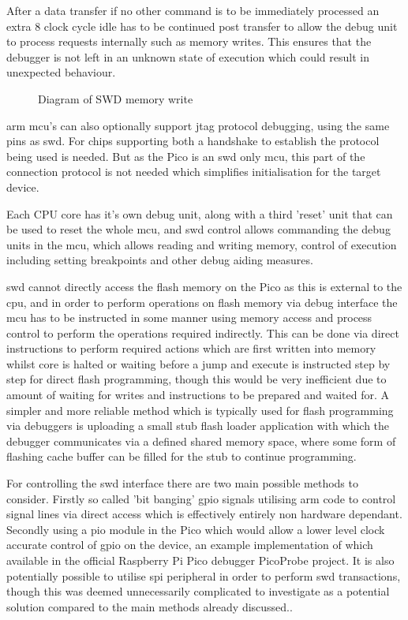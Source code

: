 {After a data transfer if no other command is to be immediately processed an extra 8 clock cycle idle has to be continued post transfer to allow the debug unit to process requests internally such as memory writes. This ensures that the debugger is not left in an unknown state of execution which could result in unexpected behaviour.

\begin{figure}[ht]
	\centering
	\caption{Diagram of SWD memory write\cite{ARMDebugInterface}}
	\label{fig:armswdwrite}
\end{figure}

\gls{arm} \gls{mcu}'s can also optionally support \gls{jtag} protocol debugging, using the same pins as \gls{swd}. For chips supporting both a handshake to establish the protocol being used is needed. But as the Pico is an \gls{swd} only \gls{mcu}, this part of the connection protocol is not needed which simplifies initialisation for the target device.

Each CPU core has it's own debug unit, along with a third 'reset' unit that can be used to reset the whole \gls{mcu}, and \gls{swd} control allows commanding the debug units in the \gls{mcu}, which allows reading and writing memory, control of execution including setting breakpoints and other debug aiding measures.

\gls{swd} cannot directly access the flash memory on the Pico as this is external to the \gls{cpu}, and in order to perform operations on flash memory via debug interface the \gls{mcu} has to be instructed in some manner using memory access and process control to perform the operations required indirectly. This can be done via direct instructions to perform required actions which are first written into memory whilst core is halted or waiting before a jump and execute is instructed step by step for direct flash programming, though this would be very inefficient due to amount of waiting for writes and instructions to be prepared and waited for. A simpler and more reliable method which is typically used for flash programming via debuggers is uploading a small stub flash loader application with which the debugger communicates via a defined shared memory space, where some form of flashing cache buffer can be filled for the stub to continue programming.

For controlling the \gls{swd} interface there are two main possible methods to consider. Firstly so called 'bit banging' \gls{gpio} signals utilising \gls{arm} code to control signal lines via direct access which is effectively entirely non hardware dependant. Secondly using a \gls{pio} module in the Pico which would allow a lower level clock accurate control of \gls{gpio} on the device, an example implementation of which available in the official Raspberry Pi Pico debugger PicoProbe project\cite{Picoprobe2023}. It is also potentially possible to utilise \gls{spi} peripheral in order to perform \gls{swd} transactions, though this was deemed unnecessarily complicated to investigate as a potential solution compared to the main methods already discussed.\cite{OpenOCDRaspberryPi}.

}
